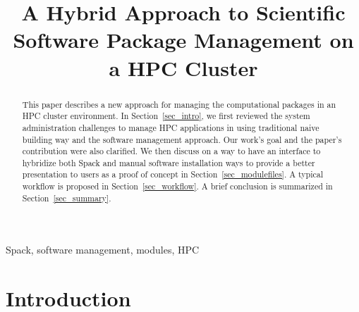 \documentclass[conference]{IEEEtran}
\begin{document}
\title{A Hybrid Approach to Scientific Software Package Management on a HPC Cluster}

\author{
\and
{}
}

\maketitle

\begin{abstract}
This paper describes a new approach for managing the computational packages in an HPC cluster environment.
In Section~\ref{sec_intro}, we first reviewed the system administration challenges to manage HPC applications in using traditional naive building way and the software management approach. Our work's goal and the paper's contribution were also clarified.
We then discuss on a way to have an interface to hybridize both Spack and manual software installation ways to provide a better presentation to users as a proof of concept in Section~\ref{sec_modulefiles}. A typical workflow is proposed in Section~\ref{sec_workflow}.  
A brief conclusion is summarized in Section~\ref{sec_summary}.

\end{abstract}

\begin{IEEEkeywords}
Spack, software management, modules, HPC 
\end{IEEEkeywords}

\section{Introduction}\label{sec_intro}
\end{document}
